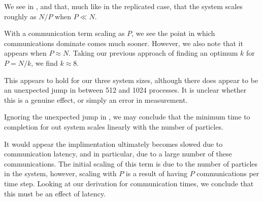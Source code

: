 \begin{figure}[!h]
    
    \caption{}
    \label{fig:v0_systolic_pair_operation_4096_logtime}
\end  {figure}

\begin{figure}[!h]
    
    \caption{}
    \label{fig:v0_systolic_pair_operation_32768_logtime}
\end  {figure}

We see in 
,
 and
that, much like in the replicated case, that the system scales
roughly as $N/P$ when $P \ll{} N$.

With a communication term scaling as $P$, we see the point in which
communications dominate comes much sooner.
%
However, we also note that it appears when $P \approx{} N$.
%
Taking our previous approach of finding an optimum $k$ for $P = N/k$,
we find $k \approx{} 8$.

This appears to hold for our three system sizes, although there does appear
to be an unexpected jump in
between 512 and 1024 processes.
%
It is unclear whether this is a genuine effect, or simply an error in
measurement.

Ignoring the unexpected jump in 
,
we may conclude that the minimum time to completion for out system
scales linearly with the number of particles.

It would appear the implimentation ultimately becomes slowed due to
communication latency, and in particular, due to a large number
of these communications.
%
The initial scaling of this term is due to the number of particles
in the system, however,
scaling with $P$ is a result of having $P$ communications
per time step.
%
Looking at our derivation for communication times,
we conclude that this must be an effect of latency.
